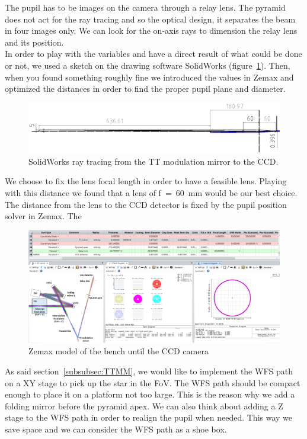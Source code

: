 \documentclass[12pt,a4paper]{article}
\begin{document}
The pupil has to be images on the camera through a relay lens. The pyramid does not act for the ray tracing and so the optical design, it separates the beam in four images only. We can look for the on-axis rays to dimension the relay lens and its position.\\
In order to play with the variables and have a direct result of what could be done or not, we used a sketch on the drawing software SolidWorks (figure~\ref{fig:SW_trace_rayons_TTMM_CCD}). Then, when you found something roughly fine we introduced the values in Zemax and optimized the distances in order to find the proper pupil plane and diameter.
\begin{figure}[H]
	\begin{center}
		\includegraphics[width=\textwidth]{images/SW_trace_rayons_TTMM_CCD.PNG}
		\caption{SolidWorks ray tracing from the TT modulation mirror to the CCD.}\label{fig:SW_trace_rayons_TTMM_CCD}
	\end{center}
\end{figure}
We choose to fix the lens focal length in order to have a feasible lens. Playing with this distance we found that a lens of f~=~60~mm would be our best choice. The distance from the lens to the CCD detector is fixed by the pupil position solver in Zemax. The 
\begin{figure}[H]
	\begin{center}
		\includegraphics[width=\textwidth]{images/Zemax_model_FP_CCD.PNG}
		\caption{Zemax model of the bench until the CCD camera}\label{fig:Zemax_model_FP_CCD}
	\end{center}
\end{figure}
As said section~\ref{subsubsec:TTMM}, we would like to implement the WFS path on a XY stage to pick up the star in the FoV. The WFS path should be compact enough to place it on a platform not too large. This is the reason why we add a folding mirror before the pyramid apex. We can also think about adding a Z stage to the WFS path in order to realign the pupil when needed. This way we save space and we can consider the WFS path as a shoe box.
\end{document}
